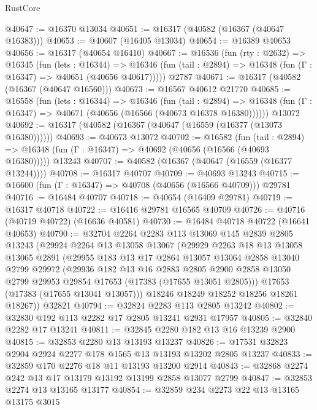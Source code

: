 \begin{lexlean}{RustCore}
\begin{coremodule}
@40647 := @16370 @13034
@40651 := @16317 (@40582 (@16367 (@40647 @16383)))
@40653 := @40607 (@16405 @13034)
@40654 := @16389 @40653
@40656 := @16317 (@40654 @16410)
@40667 := @16536
    (fun (rty : @2632) =>
    @16345
      (fun (lets : @16344) =>
      @16346 (fun (tail : @2894) => @16348 (fun (Γ : @16347) => @40651 (@40656 @40617)))))
    @2787
@40671 := @16317 (@40582 (@16367 (@40647 @16560)))
@40673 := @16567 @40612 @21770
@40685 := @16558
    (fun (lets : @16344) =>
    @16346
      (fun (tail : @2894) =>
      @16348 (fun (Γ : @16347) => @40671 (@40656 (@16566 (@40673 @16378 @16380))))))
    @13072
@40692 := @16317 (@40582 (@16367 (@40647 (@16559 (@16377 (@13073 @16380))))))
@40693 := @40673 @13072
@40702 := @16582
    (fun (tail : @2894) => @16348 (fun (Γ : @16347) => @40692 (@40656 (@16566 (@40693 @16380)))))
    @13243
@40707 := @40582 (@16367 (@40647 (@16559 (@16377 @13244))))
@40708 := @16317 @40707
@40709 := @40693 @13243
@40715 := @16600 (fun (Γ : @16347) => @40708 (@40656 (@16566 @40709))) @29781
@40716 := @16484 @40707
@40718 := @40654 (@16409 @29781)
@40719 := @16317 @40718
@40722 := @16416 @29781 @16565 @40709
@40726 := @40716 (@40719 @40722) (@16636 @40581)
@40730 := @16484 @40718 @40722 (@16641 @40653)
@40790 := @32704
    @2264
    @2283
    @113
    @13069
    @145
    @2839
    @2805
    @13243
    (@29924
      @2264
      @13
      @13058
      @13067
      (@29929
        @2263
        @18
        @13
        @13058
        @13065
        @2891
        (@29955
          @183
          @13
          @17
          @2864
          @13057
          @13064
          @2858
          @13040
          @2799
          @29972
          (@29936
            @182
            @13
            @16
            @2883
            @2805
            @2900
            @2858
            @13050
            @2799
            @29953
            @29854
            @17653
            (@17383 (@17655 @13051 @2805)))
          @17653
          (@17383 (@17655 @13041 @13057)))
        @18246
        @18249
        @18252
        @18256
        @18261
        @18267))
    @32821
@40794 := @32824 @2283 @113 @2805 @13242
@40802 := @32830 @192 @113 @2282 @17 @2805 @13241 @2931 @17957
@40805 := @32840 @2282 @17 @13241
@40811 := @32845 @2280 @182 @13 @16 @13239 @2900
@40815 := @32853 @2280 @13 @13193 @13237
@40826 := @17531 @32823 @2904 @2924 @2277 @178 @1565 @13 @13193 @13202 @2805 @13237
@40833 := @32859 @170 @2276 @18 @11 @13193 @13200 @2914
@40843 := @32868 @2274 @242 @13 @17 @13179 @13192 @13199 @2858 @13077 @2799
@40847 := @32853 @2274 @13 @13165 @13177
@40854 := @32859 @234 @2273 @22 @13 @13165 @13175 @3015

\end{coremodule}
\end{lexlean}
